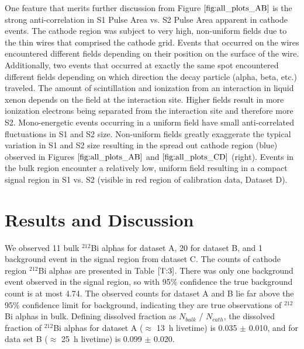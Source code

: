 One feature that merits further discussion from Figure $\ref{fig:all_plots_AB}$ is the strong anti-correlation in S1 Pulse Area vs. S2 Pulse Area apparent in cathode events. The cathode region was subject to very high, non-uniform fields due to the thin wires that comprised the cathode grid. Events that occurred on the wires encountered different fields depending on their position on the surface of the wire. Additionally, two events that occurred at exactly the same spot encountered different fields depending on which direction the decay particle (alpha, beta, etc.) traveled. The amount of scintillation and ionization from an interaction in liquid xenon depends on the field at the interaction site. Higher fields result in more ionization electrons being separated from the interaction site and therefore more S2. Mono-energetic events occurring in a uniform field have small anti-correlated fluctuations in S1 and S2 size. Non-uniform fields greatly exaggerate the typical variation in S1 and S2 size resulting in the spread out cathode region (blue) observed in Figures $\ref{fig:all_plots_AB}$ and $\ref{fig:all_plots_CD}$  (right). Events in the bulk region encounter a relatively low, uniform field resulting in a compact signal region in S1 vs. S2 (visible in red region of calibration data, Dataset D). 


\section{Results and Discussion}
\label{results}
We observed 11 bulk $^{212}$Bi alphas for dataset A, 20 for dataset B, and 1 background event in the signal region from dataset C. The counts of cathode region $^{212}$Bi alphas are presented in Table $\ref{T:3}$. There was only one background event observed in the signal region, so with 95\% confidence the true background count is at most 4.74. The observed counts for dataset A and B lie far above the 95\% confidence limit for background, indicating they are true observations of  $^{212}$Bi alphas in bulk. Defining dissolved fraction as $N_{bulk}$ / $N_{cath}$, the dissolved fraction of $^{212}$Bi alphas for dataset A ($\approx$ 13~h livetime) is 0.035 $\pm$ 0.010, and for data set B ($\approx$ 25~h livetime) is 0.099 $\pm$ 0.020. 

